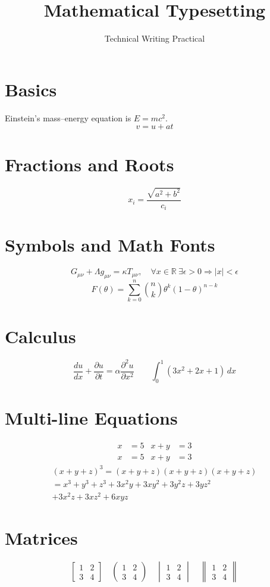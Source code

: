 \documentclass[12pt,a4paper]{article}
\title{Mathematical Typesetting}
\author{Technical Writing Practical}
\date{}
\begin{document}
\maketitle
\section{Basics}
Einstein's mass--energy equation is \(E=mc^2\).
\[
v=u+at
\]
\section{Fractions and Roots}
\[
x_i=\frac{\sqrt{a^2+b^2}}{c_i}
\]
\section{Symbols and Math Fonts}
\[
G_{\mu\nu}+\Lambda g_{\mu\nu}=\kappa T_{\mu\nu},
\quad \forall x\in\mathbb R\ \exists\epsilon>0\Rightarrow |x|<\epsilon
\]
\[
F(\theta)=\sum_{k=0}^{n}\binom nk\theta^k(1-\theta)^{n-k}
\]
\section{Calculus}
\[
\frac{du}{dx}+\frac{\partial u}{\partial t}
=\alpha\frac{\partial^2u}{\partial x^2}
\qquad
\int_0^1(3x^2+2x+1)\,dx
\]
\section{Multi-line Equations}
\begin{align}
x&=5 & x+y&=3\\
x&=5 & x+y&=3
\end{align}
\begin{multline*}
(x+y+z)^3=(x+y+z)(x+y+z)(x+y+z)\\
=x^3+y^3+z^3+3x^2y+3xy^2+3y^2z+3yz^2\\
+3x^2z+3xz^2+6xyz
\end{multline*}
\section{Matrices}
\[
\begin{bmatrix}1&2\\3&4\end{bmatrix}\quad
\begin{pmatrix}1&2\\3&4\end{pmatrix}\quad
\begin{vmatrix}1&2\\3&4\end{vmatrix}\quad
\begin{Vmatrix}1&2\\3&4\end{Vmatrix}
\]
\end{document}
